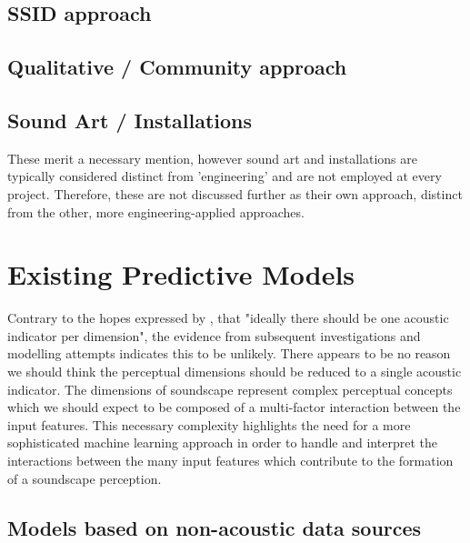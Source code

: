 \subsection{SSID approach}

\subsection{Qualitative / Community approach}

\subsection{Sound Art / Installations}

These merit a necessary mention, however sound art and installations are typically considered distinct from 'engineering' and are not employed at every project. Therefore, these are not discussed further as their own approach, distinct from the other, more engineering-applied approaches. 



\section{Existing Predictive Models}

Contrary to the hopes expressed by \citet{Aletta2014Towards}, that "ideally there should be one acoustic indicator per dimension", the evidence from subsequent investigations and modelling attempts \citep{Lionello2020systematic} indicates this to be unlikely. There appears to be no reason we should think the perceptual dimensions should be reduced to a single acoustic indicator. The dimensions of soundscape represent complex perceptual concepts which we should expect to be composed of a multi-factor interaction between the input features. This necessary complexity  highlights the need for a more sophisticated machine learning approach in order to handle and interpret the interactions between the many input features which contribute to the formation of a soundscape perception.
\citep{Aletta2016Soundscape}

\citep{Lionello2020systematic}

\subsection{Models based on non-acoustic data sources}


